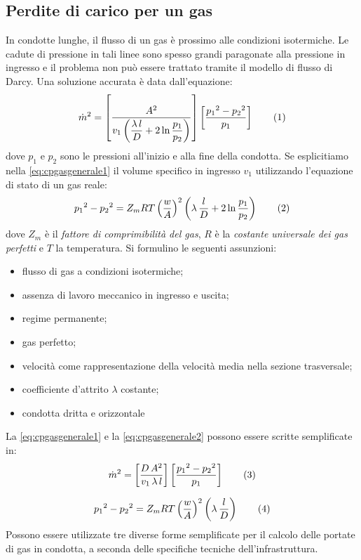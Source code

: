 \subsection{Perdite di carico per un gas}
In condotte lunghe, il flusso di un gas è prossimo alle condizioni isotermiche. Le cadute di pressione in tali linee sono spesso grandi paragonate alla pressione in ingresso e il problema non può essere trattato tramite il modello di flusso di Darcy. Una soluzione accurata è data dall'equazione:
\[\dot{m}^2=\left[\dfrac{A^2}{v_1\left(\dfrac{\lambda\,l}{D}+2\ln\dfrac{p_1}{p_2}\right)}\right]\left[\dfrac{{p_1}^2-{p_2}^2}{p_1}\right] \addtag \label{eq:cpgasgenerale1}\]
dove \(p_1\) e \(p_2\) sono le pressioni all'inizio e alla fine della condotta.
Se esplicitiamo nella \eqref{eq:cpgasgenerale1} il volume specifico in ingresso \(v_1\) utilizzando l'equazione di stato di un gas reale:
\[{p_1}^2-{p_2}^2=Z_m R T \left(\dfrac{w}{A}\right)^2\left(\lambda \, \dfrac{l}{D}+2\ln\dfrac{p_1}{p_2}\right)  \addtag \label{eq:cpgasgenerale2}\]
dove \(Z_m\) è il \textit{fattore di comprimibilità del gas}, \(R\) è la \textit{costante universale dei gas perfetti} e \(T\) la temperatura.
Si formulino le seguenti assunzioni:
\begin{itemize}
    \item flusso di gas a condizioni isotermiche;
    \item assenza di lavoro meccanico in ingresso e uscita;
    \item regime permanente;
    \item gas perfetto;
    \item velocità come rappresentazione della velocità media nella sezione trasversale;
    \item coefficiente d'attrito \(\lambda\) costante;
    \item condotta dritta e orizzontale
\end{itemize}
La \eqref{eq:cpgasgenerale1} e la \eqref{eq:cpgasgenerale2} possono essere scritte semplificate in:
\[\dot{m}^2=\left[ \dfrac{D \, A^2}{v_1 \, \lambda \, l}\right] \left[\dfrac{{p_1}^2-{p_2}^2}{p_1}\right] \addtag \label{eq:cpgassempl1} \]

\[{p_1}^2-{p_2}^2=Z_m R T \left(\dfrac{w}{A}\right)^2\left(\lambda \, \dfrac{l}{D}\right)  \addtag \label{eq:cpgassempl2}\]
Possono essere utilizzate tre diverse forme semplificate per il calcolo delle portate di gas in condotta, a seconda delle specifiche tecniche dell'infrastruttura.


